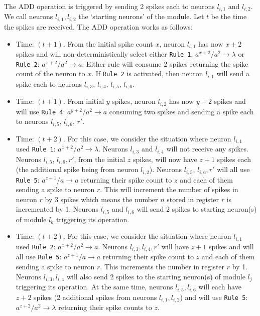 \documentclass[runningheads,a4paper]{llncs}
\begin{document}
The ADD operation is triggered by sending 2 spikes each to neurons $l_{i,1}$ and ${l_{i,2}}$. We call neurons $l_{i,1}, l_{i,2}$ the `starting neurons'
of the module. Let $t$ be the time the spikes are received. The ADD operation works as follows:
\begin{itemize}
   \item Time: $(t+1)$. From the initial spike count $x$, neuron $l_{i,1}$ has now $x+2$ spikes and will non-deterministically select either 
                        \texttt{Rule 1}: $a^{x+2}/a^2 \rightarrow \lambda$ or \texttt{Rule 2}: $a^{x+2}/a^2 \rightarrow a$. Either rule will consume
                        2 spikes returning the spike count of the neuron to $x$. If \texttt{Rule 2} is activated, then neuron $l_{i,1}$ will send a 
                        spike each to neurons $l_{i,3}$, $l_{i,4}$, $l_{i,5}$, $l_{i,6}$.
   \item Time: $(t+1)$. From initial $y$ spikes, neuron $l_{i,2}$ has now $y+2$ spikes and will use \texttt{Rule 4}: $a^{y+2}/a^2 \rightarrow a$ 
                        consuming two spikes and sending a spike each to neurons $l_{i,5}$, $l_{i,6}$, $r'$.

   \item Time: $(t+2)$. For this case, we consider the situation where neuron $l_{i,1}$ used \texttt{Rule 1}: $a^{x+2}/a^2 \rightarrow \lambda$. 
                        Neurons $l_{i,3}$ and $l_{i,4}$ will not receive any spikes. Neurons $l_{i,5}$, $l_{i,6}, r'$, from the initial $z$ spikes, 
                        will now have $z+1$ spikes each (the additional spike being from neuron $l_{i,2}$). Neurons $l_{i,5}$, $l_{i,6}, r'$ will all
                        use \texttt{Rule 5}: $a^{z+1}/a \rightarrow a$ returning their spike count to $z$ and each of them sending a spike to neuron 
                        $r$. This will increment the number of spikes in neuron $r$ by 3 spikes which means the number $n$ stored in register $r$ is 
                        incremented by 1. Neurons $l_{i,5}$ and $l_{i,6}$ will send $2$ spikes to starting neuron(s) of module $l_k$ triggering its 
                        operation.
   \item Time: $(t+2)$. For this case, we consider the situation where neuron $l_{i,1}$ used \texttt{Rule 2}: $a^{x+2}/a^2 \rightarrow a $.
                        Neurons $l_{i,3}, l_{i,4}, r'$ will have $z+1$ spikes and will all use  \texttt{Rule 5}: $a^{z+1}/a \rightarrow a$ returning 
                        their spike count to $z$ and each of them sending a spike to neuron $r$. This increments the number in register $r$ by 1.
                        Neurons $l_{i,3}, l_{i,4}$ will also send 2 spikes to the starting neuron(s) of module $l_j$ triggering its operation. At the same
                        time, neurons $l_{i,5}, l_{i,6}$ will each have $z+2$ spikes (2 additional spikes from neurons $l_{i,1}, l_{i,2}$) and will 
                        use \texttt{Rule 5}: $a^{z+2}/a^2 \rightarrow \lambda$ returning their spike counts to $z$.
\end{itemize}
\end{document}
